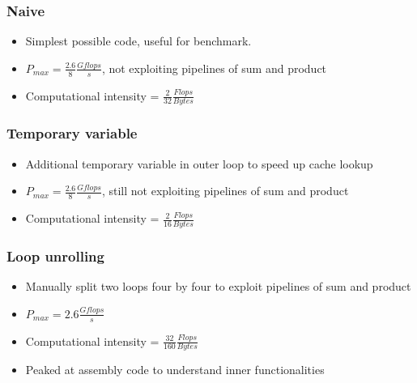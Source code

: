 \documentclass{beamer}
\begin{document}
\begin{frame}
\frametitle{Naive}
\begin{itemize}
\item <1-> Simplest possible code, useful for benchmark.
\item <2-> $P_{max} = \frac{2.6}{8}\frac{Gflops}{s}$, not exploiting pipelines of sum and product
\item <3-> Computational intensity = $\frac{2}{32}\frac{Flops}{Bytes}$
\end{itemize}
\end{frame}

\begin{frame}
\frametitle{Temporary variable}
\begin{itemize}
\item <1->  Additional temporary variable in outer loop to speed up cache lookup
\item <2-> $P_{max} = \frac{2.6}{8}\frac{Gflops}{s}$, still not exploiting pipelines of sum and product
\item <3-> Computational intensity = $\frac{2}{16}\frac{Flops}{Bytes}$
\end{itemize}
\end{frame}

\begin{frame}
\frametitle{Loop unrolling}
\begin{itemize}
\item <1->  Manually split two loops four by four to exploit pipelines of sum and product
\item <2-> $P_{max} =2.6\frac{Gflops}{s}$ 
\item <3-> Computational intensity = $\frac{32}{160}\frac{Flops}{Bytes}$
\item <4-> Peaked at assembly code to understand inner functionalities 
\end{itemize}
\end{frame}

\end{document}
